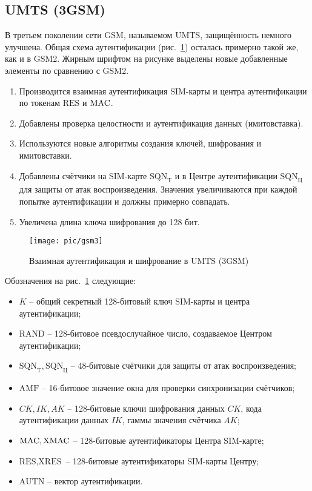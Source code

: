 \subsection{UMTS (3GSM)}

В третьем поколении сети GSM, называемом UMTS, защищённость немного улучшена. Общая схема аутентификации (рис.~\ref{fig:gsm3}) осталась примерно такой же, как и в GSM2. Жирным шрифтом на рисунке выделены новые добавленные элементы по сравнению с GSM2.
\begin{enumerate}
    \item Производится взаимная аутентификация SIM-карты и центра аутентификации по токенам $\textrm{RES}$ и $\textrm{MAC}$.
    \item Добавлены проверка целостности и аутентификация данных (имитовставка).
    \item Используются новые алгоритмы создания ключей, шифрования и имитовставки.
    \item Добавлены счётчики на SIM-карте $\textrm{SQN}_\textrm{T}$ и в Центре аутентификации $\textrm{SQN}_\textrm{Ц}$ для защиты от атак воспроизведения. Значения увеличиваются при каждой попытке аутентификации и должны примерно совпадать.
    \item Увеличена длина ключа шифрования до 128 бит.
\end{enumerate}

\begin{figure}[!ht]
	\centering
	\texttt{[image: pic/gsm3]}
	\caption{Взаимная аутентификация и шифрование в UMTS (3GSM)\label{fig:gsm3}}
\end{figure}

Обозначения на рис.~\ref{fig:gsm3} следующие:
\begin{itemize}
    \item $K$ -- общий секретный 128-битовый ключ SIM-карты и центра аутентификации;
    \item $\textrm{RAND}$ -- 128-битовое псевдослучайное число, создаваемое Центром аутентификации;
    \item $\textrm{SQN}_\textrm{T}, \textrm{SQN}_\textrm{Ц}$ -- 48-битовые счётчики для защиты от атак воспроизведения;
    \item $\textrm{AMF}$ -- 16-битовое значение окна для проверки синхронизации счётчиков;
    \item $CK, IK, AK$ -- 128-битовые ключи шифрования данных $CK$, кода аутентификации данных $IK$, гаммы значения счётчика $AK$;
    \item $\textrm{MAC}, \textrm{XMAC}$ -- 128-битовые аутентификаторы Центра SIM-карте;
    \item $\textrm{RES}, \textrm{XRES}$ -- 128-битовые аутентификаторы SIM-карты Центру;
    \item $\textrm{AUTN}$ -- вектор аутентификации.
\end{itemize}

